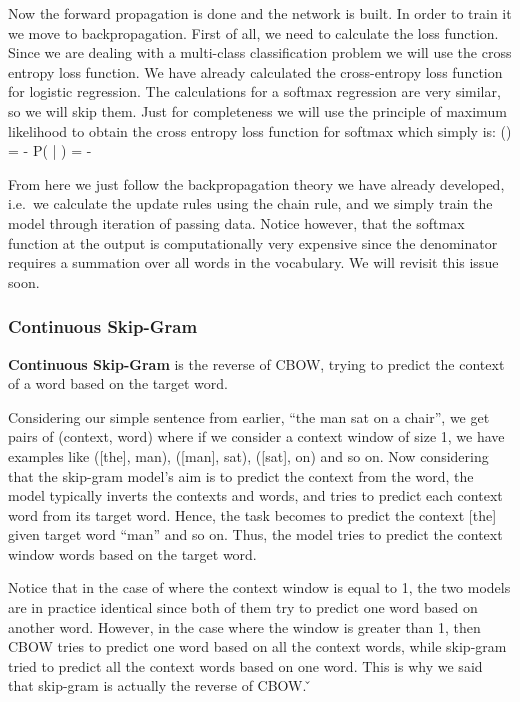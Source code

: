 Now the forward propagation is done and the network is built. In order to train it we move to backpropagation. First
of all, we need to calculate the loss function. Since we are dealing with a multi-class classification problem we
will use the cross entropy loss function. We have already calculated the cross-entropy loss function for logistic
regression. The calculations for a softmax regression are very similar, so we will skip them. Just for completeness
we will use the principle of maximum likelihood to obtain the cross entropy loss function for softmax which simply
is:
\bse
{}(\theta) = - \ln P( | ) = - \ln {}
\ese

From here we just follow the backpropagation theory we have already developed, i.e.\ we calculate the update rules
using the chain rule, and we simply train the model through iteration of passing data. Notice however, that the
softmax function at the output is computationally very expensive since the denominator requires a summation over all
words in the vocabulary. We will revisit this issue soon.

\subsubsection{Continuous Skip-Gram}

\textbf{Continuous Skip-Gram} is the reverse of CBOW, trying to predict the context of a word based on the target word.
\ed

\be
Considering our simple sentence from earlier, ``the man sat on a chair'', we get pairs of (context, word) where if we
consider a context window of size 1, we have examples like ([the], man), ([man], sat), ([sat], on) and so on. Now
considering that the skip-gram model's aim is to predict the context from the word, the model typically inverts the
contexts and words, and tries to predict each context word from its target word. Hence, the task becomes to predict
the context [the] given target word ``man'' and so on. Thus, the model tries to predict the context window words
based on the target word.
\vspace{-10pt}
\ee

Notice that in the case of where the context window is equal to 1, the two models are in practice identical since
both of them try to predict one word based on another word. However, in the case where the window is greater than 1,
then CBOW tries to predict one word based on all the context words, while skip-gram tried to predict all the context
words based on one word. This is why we said that skip-gram is actually the reverse of CBOW\@. \v

